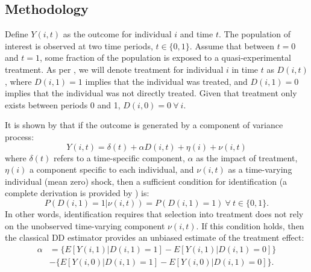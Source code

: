 \documentclass{article}
\begin{document}
\begin{spacing}{1.1}
\nocite{AngelucciDeGiorgi2009} \nocite{Heckmanetal1998}
\nocite{MiguelKremer2004}
 \nocite{Heckmanetal1998b}

\section{Methodology}
Define $Y(i,t)$ as the outcome for individual $i$ and time $t$.  The population
of interest is observed at two time periods, $t\in \{0,1\}$. Assume that between
$t=0$ and $t=1$, some fraction of the population is exposed to a 
quasi-experimental treatment.  As per \citet{Abadie2005}, we will denote 
treatment for individual $i$ in time $t$ as $D(i,t)$, where $D(i,1)=1$ implies 
that the individual was treated, and $D(i,1)=0$ implies that the individual was
not directly treated.  Given that treatment only exists between periods 0 and 1,
$D(i,0)=0\ \forall\ i$.

It is shown by \citet{AshenfelterCard1985} that if the outcome is generated by
a component of variance process:
\begin{equation}
\label{Seqn:COV}
Y(i,t)=\delta(t) + \alpha D(i,t)+\eta(i)+\nu(i,t)
\end{equation}
where $\delta(t)$ refers to a time-specific component, $\alpha$ as the impact of 
treatment, $\eta(i)$ a component specific to each individual, and $\nu(i,t)$ as 
a time-varying individual (mean zero) shock, then a sufficient condition for 
identification (a complete derivation is provided by \citet{Abadie2005}) is:
\begin{equation}
\label{Seqn:ID}
P(D(i,1)=1|\nu(i,t))=P(D(i,1)=1) \ \forall\ t\in\{0,1\}.
\end{equation}
In other words, identification requires that selection into treatment does not
rely on the unobserved time-varying component $\nu(i,t)$.  If this condition 
holds, then the classical DD estimator provides an unbiased estimate of the
treatment effect:
\begin{equation}
\label{Seqn:DD}
\begin{split}
\alpha&=\{E[Y(i,1)|D(i,1)=1]-E[Y(i,1)|D(i,1)=0]\} \\
      &-\{E[Y(i,0)|D(i,1)=1]-E[Y(i,0)|D(i,1)=0]\}.
\end{split}
\end{equation}


\end{spacing}
\end{document}
